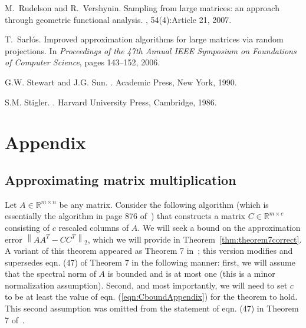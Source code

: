 \documentclass[11pt]{article}
\newcommand{\TNorm }[1]{\mbox{}\left\|#1\right\|_2  }
\begin{document}
\begin{thebibliography}{10}
M.~Rudelson and R.~Vershynin.
\newblock Sampling from large matrices: an approach through geometric
  functional analysis.
, 54(4):Article 21, 2007.

T.~Sarl\'{o}s.
\newblock Improved approximation algorithms for large matrices via random
  projections.
\newblock In {\em Proceedings of the 47th Annual IEEE Symposium on Foundations
  of Computer Science}, pages 143--152, 2006.

G.W. Stewart and J.G. Sun.
.
\newblock Academic Press, New York, 1990.

S.M. Stigler.
.
\newblock Harvard University Press, Cambridge, 1986.

\end{thebibliography}
\section{Appendix}

\subsection{Approximating matrix multiplication}

Let $A \in \mathbb{R}^{m \times n}$ be any matrix. Consider the following algorithm (which is essentially the algorithm in page 876 of~\cite{DMM08_CURtheory_JRNL}) that constructs a matrix $C\in \mathbb{R}^{m \times c}$ consisting of $c$ rescaled columns of $A$. We will seek a bound on the approximation error $\TNorm{AA^T-CC^T}$, which we will provide in Theorem~\ref{thm:theorem7correct}. A variant of this theorem appeared as Theorem 7 in~\cite{DMM08_CURtheory_JRNL}; this version modifies and supersedes eqn. (47) of Theorem 7 in the following manner: first, we will assume that the spectral norm of $A$ is bounded and is at most one (this is a minor normalization assumption). Second, and most importantly, we will need to set $c$ to be at least the value of eqn. (\ref{eqn:CboundAppendix}) for the theorem to hold. This second assumption was omitted from the statement of eqn. (47) in Theorem 7 of~\cite{DMM08_CURtheory_JRNL}.
\end{document}
